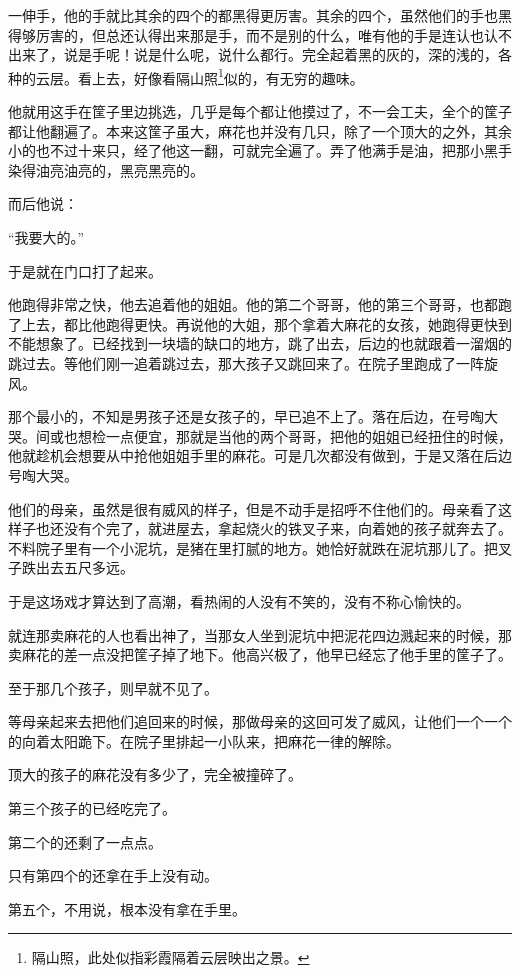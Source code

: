 \par 一伸手，他的手就比其余的四个的都黑得更厉害。其余的四个，虽然他们的手也黑得够厉害的，但总还认得出来那是手，而不是别的什么，唯有他的手是连认也认不出来了，说是手呢！说是什么呢，说什么都行。完全起着黑的灰的，深的浅的，各种的云层。看上去，好像看隔山照\footnote{隔山照，此处似指彩霞隔着云层映出之景。}似的，有无穷的趣味。
\par 他就用这手在筐子里边挑选，几乎是每个都让他摸过了，不一会工夫，全个的筐子都让他翻遍了。本来这筐子虽大，麻花也并没有几只，除了一个顶大的之外，其余小的也不过十来只，经了他这一翻，可就完全遍了。弄了他满手是油，把那小黑手染得油亮油亮的，黑亮黑亮的。
\par 而后他说：
\par “我要大的。”
\par 于是就在门口打了起来。
\par 他跑得非常之快，他去追着他的姐姐。他的第二个哥哥，他的第三个哥哥，也都跑了上去，都比他跑得更快。再说他的大姐，那个拿着大麻花的女孩，她跑得更快到不能想象了。已经找到一块墙的缺口的地方，跳了出去，后边的也就跟着一溜烟的跳过去。等他们刚一追着跳过去，那大孩子又跳回来了。在院子里跑成了一阵旋风。
\par 那个最小的，不知是男孩子还是女孩子的，早已追不上了。落在后边，在号啕大哭。间或也想检一点便宜，那就是当他的两个哥哥，把他的姐姐已经扭住的时候，他就趁机会想要从中抢他姐姐手里的麻花。可是几次都没有做到，于是又落在后边号啕大哭。
\par 他们的母亲，虽然是很有威风的样子，但是不动手是招呼不住他们的。母亲看了这样子也还没有个完了，就进屋去，拿起烧火的铁叉子来，向着她的孩子就奔去了。不料院子里有一个小泥坑，是猪在里打腻的地方。她恰好就跌在泥坑那儿了。把叉子跌出去五尺多远。
\par 于是这场戏才算达到了高潮，看热闹的人没有不笑的，没有不称心愉快的。
\par 就连那卖麻花的人也看出神了，当那女人坐到泥坑中把泥花四边溅起来的时候，那卖麻花的差一点没把筐子掉了地下。他高兴极了，他早已经忘了他手里的筐子了。
\par 至于那几个孩子，则早就不见了。
\par 等母亲起来去把他们追回来的时候，那做母亲的这回可发了威风，让他们一个一个的向着太阳跪下。在院子里排起一小队来，把麻花一律的解除。
\par 顶大的孩子的麻花没有多少了，完全被撞碎了。
\par 第三个孩子的已经吃完了。
\par 第二个的还剩了一点点。
\par 只有第四个的还拿在手上没有动。
\par 第五个，不用说，根本没有拿在手里。
